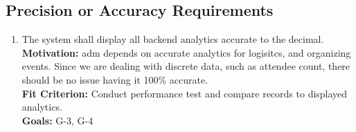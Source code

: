 \documentclass[12pt]{article}
\begin{document}
\subsection{Precision or Accuracy Requirements}
\begin{enumerate}[label=\bfseries PA-\arabic*:, wide=0pt, leftmargin=*, ref=\bfseries PA-\arabic*]
  \item \label{PA1} The system shall display all backend analytics accurate to the decimal.\\
  {\bf Motivation:} \Gls{adm} depends on accurate analytics for logisitcs, and organizing events. Since we are dealing with discrete data, such as attendee count, there should be no issue having it 100\% accurate.\\
  {\bf Fit Criterion:} Conduct performance test and compare records to displayed analytics.\\
  {\bf Goals:} G-3, G-4
\end{enumerate}
\end{document}
